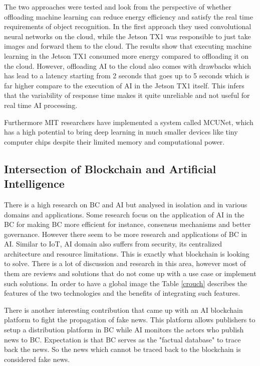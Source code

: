 The two approaches were tested and look from the perspective of whether offloading machine learning can reduce energy efficiency and satisfy the real time requirements of object recognition. 
In the first approach they used convolutional neural networks on the cloud, while the Jetson TX1 was responsible to just take images and forward them to the cloud. The results show that executing machine learning in the Jetson TX1 consumed more energy compared to offloading it on the cloud. However, offloading AI to the cloud also comes with drawbacks which has lead to a latency starting from 2 seconds that goes up to 5 seconds which is far higher compare to the execution of AI in the Jetson TX1 itself. This infers that the variability of response time makes it quite unreliable and not useful for real time AI processing. 

Furthermore MIT researchers \cite{mit123} have implemented a system called MCUNet, which has a high potential to bring deep learning in much smaller devices like tiny computer chips despite their limited memory and computational power. 

\subsection{Intersection of Blockchain and Artificial Intelligence}

There is a high research on BC and AI but analysed in isolation and in various domains and applications. Some research \cite{8481263} focus on the application of AI in the BC for making BC more efficient for instance, consensus mechanisms and better governance. However there seem to be more research and applications of BC in AI. Similar to IoT, AI domain also suffers from security, its centralized architecture and resource limitations. This is exactly what blockchain is looking to solve. There is a lot of discussion and research in this area, however most of them are reviews and solutions that do not come up with a use case or implement such solutions. In order to have a global image the Table \ref{crouch} describes the features of the two technologies and the benefits of integrating such features.

There is another interesting contribution \cite{8884985} that came up with an AI blockchain platform to fight the propagation of fake news. This platform allows publishers to setup a distribution platform in BC while AI monitors the actors who publish news to BC. Expectation is that BC serves as the "factual database" to trace back the news. So the news which cannot be traced back to the blockchain is considered fake news. 




